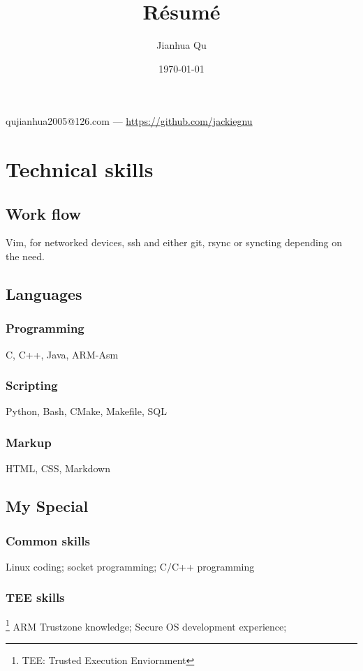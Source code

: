 \documentclass{article}
\makeatletter
\renewcommand{\maketitle}{
\begin{center}

{\huge\bfseries\theauthor}

\vspace{.25em}
qujianhua2005@126.com --- \url {https://github.com/jackiegnu}

\vspace{.25em}
\thedate

\end{center}
}
\makeatother
\begin{document}
\title {R\'esum\'e}
\author {Jianhua Qu}
\date{\today}

\maketitle

\section{Technical skills}

\subsection{Work flow}
    Vim, for networked devices, ssh and either git, rsync or syncting depending on the need.

\subsection{Languages}

\subsubsection{Programming}
C, C++, Java, ARM-Asm

\subsubsection{Scripting}
Python, Bash, CMake, Makefile, SQL

\subsubsection{Markup}
HTML, CSS, Markdown

\subsection{My Special}

\subsubsection {Common skills}
Linux coding; socket programming; C/C++ programming

\subsubsection {TEE skills}\footnote {TEE: Trusted Execution Enviornment}
ARM Trustzone knowledge; Secure OS development experience;
\end{document}
